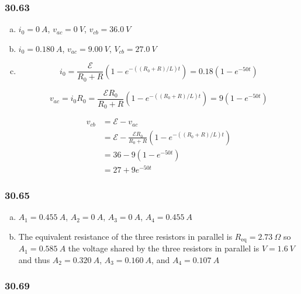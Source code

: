 \documentclass{article}
\begin{document}
\subsubsection{30.63}

\begin{enumerate}[(a)]
  \item $i_0 = \qty{0}{A}$, $v_{ac} = \qty{0}{V}$, $v_{cb} = \qty{36.0}{V}$

  \item $i_0 = \qty{0.180}{A}$, $v_{ac} = \qty{9.00}{V}$, $V_{cb} = \qty{27.0}{V}$

  \item

        \[i_0 = \frac{\mathcal{E}}{R_0 + R} (1 - e^{-((R_0 + R) / L) t}) = 0.18 (1 - e^{-50 t})\]

        \[v_{ac} = i_0 R_0 = \frac{\mathcal{E} R_0}{R_0 + R} (1 - e^{-((R_0 + R) / L) t}) = 9 (1 - e^{-50 t})\]

        \begin{align*}
          v_{cb} & = \mathcal{E} - v_{ac}                                                       \\
                 & = \mathcal{E} - \frac{\mathcal{E} R_0}{R_0 + R} (1 - e^{-((R_0 + R) / L) t}) \\
                 & = 36 - 9(1 - e^{-50 t})                                                      \\
                 & = 27 + 9 e^{-50 t}
        \end{align*}
\end{enumerate}

\subsubsection{30.65}

\begin{enumerate}[(a)]
  \item $A_1 = \qty{0.455}{A}$, $A_2 = \qty{0}{A}$, $A_3 = \qty{0}{A}$, $A_4 = \qty{0.455}{A}$

  \item The equivalent resistance of the three resistors in parallel is $R_\text{eq} = \qty{2.73}{\Omega}$ so $A_1 = \qty{0.585}{A}$ the voltage shared by the three resistors in parallel is $V = \qty{1.6}{V}$ and thus $A_2 = \qty{0.320}{A}$, $A_3 = \qty{0.160}{A}$, and $A_4 = \qty{0.107}{A}$
\end{enumerate}

\subsubsection{30.69}
\end{document}
